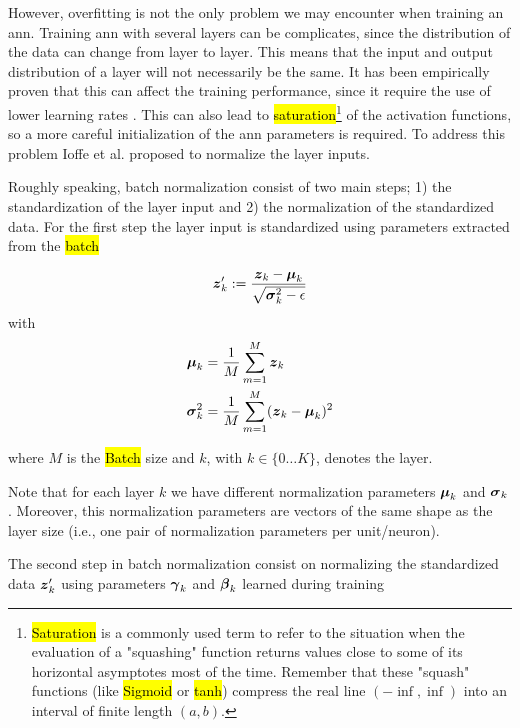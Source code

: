 However, overfitting is not the only problem we may encounter when training an \gls{ann}. Training \gls{ann} with several layers can be complicates, since the distribution of the data can change from layer to layer. This means that the input and output distribution of a layer will not necessarily be the same. It has been empirically proven that this can affect the training performance, since it require the use of lower learning rates \cite{ioffe2015batch}. This can also lead to \hl{saturation}\footnote{\hl{Saturation} is a commonly used term to refer to the situation when the evaluation of a "squashing" function returns values close to some of its horizontal asymptotes most of the time. Remember that these "squash" functions (like \hl{Sigmoid} or \hl{tanh}) compress the real line $(-\inf, \inf)$ into an interval of finite length $(a, b)$.} of the activation functions, so a more careful initialization of the \gls{ann} parameters is required. To address this problem Ioffe et al. \cite{ioffe2015batch} proposed to normalize the layer inputs.

Roughly speaking, batch normalization consist of two main steps; 1) the standardization of the layer input and 2) the normalization of the standardized data. For the first step the layer input is standardized using parameters extracted from the \hl{batch}

\begin{equation}
    \boldsymbol{z}'_k := \frac{\boldsymbol{z}_k-\boldsymbol{\mu}_k}{\sqrt{\boldsymbol{\sigma}_k^2-\epsilon}}
\end{equation}
\noindent with
\begin{equation}
  \begin{split}
    \boldsymbol{\mu}_k &= \frac{1}{M}\sum_{m=1}^M \boldsymbol{z}_k \\
    \boldsymbol{\sigma}_k^2 &= \frac{1}{M}\sum_{m=1}^M (\boldsymbol{z}_k - \boldsymbol{\mu}_k)^2 \\
  \end{split}
\end{equation}

\noindent where $M$ is the \hl{Batch} size and $k$, with $k \in \{0 \dots K\}$, denotes the layer.

Note that for each layer $k$ we have different normalization parameters $\boldsymbol{\mu}_k$ and $\boldsymbol{\sigma}_k$. Moreover, this normalization parameters are vectors of the same shape as the layer size (i.e., one pair of normalization parameters per unit/neuron).

The second step in batch normalization consist on normalizing the standardized data $\boldsymbol{z}'_k$ using parameters $\boldsymbol{\gamma}_k$ and $\boldsymbol{\beta}_k$ learned during training

